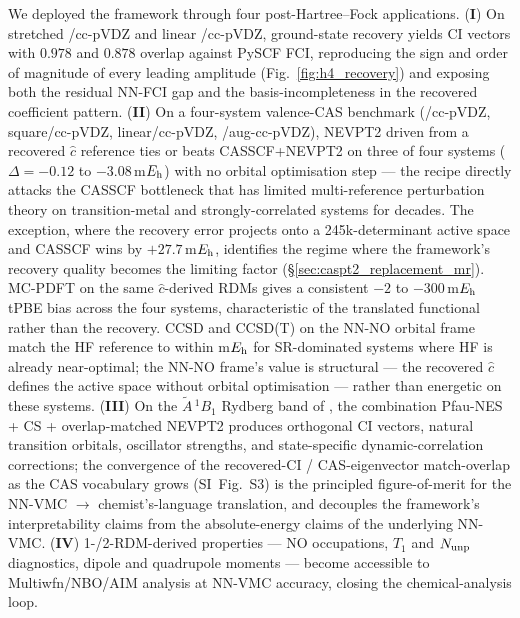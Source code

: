 \documentclass[journal=jctcce,manuscript=article,layout=traditional]{achemso}
\begin{document}
We deployed the framework through four post-Hartree--Fock applications.
(\textbf{I}) On stretched /cc-pVDZ and linear /cc-pVDZ,
ground-state recovery yields CI vectors with $0.978$ and $0.878$
overlap against PySCF FCI, reproducing the sign and order of magnitude
of every leading amplitude
(Fig.~\ref{fig:h4_recovery}) and exposing both the residual NN-FCI gap
and the basis-incompleteness in the recovered coefficient pattern.
(\textbf{II}) On a four-system valence-CAS benchmark
(/cc-pVDZ,  square/cc-pVDZ,  linear/cc-pVDZ,
/aug-cc-pVDZ), NEVPT2 driven from a recovered $\widehat c$
reference ties or beats CASSCF+NEVPT2 on three of four systems
($\Delta = -0.12$ to $-3.08$\,m$E_{\rm h}$) with no orbital
optimisation step --- the recipe directly attacks the CASSCF
bottleneck that has limited multi-reference perturbation theory on
transition-metal and strongly-correlated systems for decades. The
 exception, where the recovery error projects onto a
245k-determinant active space and CASSCF wins by $+27.7$\,m$E_{\rm
h}$, identifies the regime where the framework's recovery quality
becomes the limiting factor (\S\ref{sec:caspt2_replacement_mr}).
MC-PDFT on the same $\widehat c$-derived RDMs gives a consistent
$-2$ to $-300$\,m$E_{\rm h}$ tPBE bias across the four systems,
characteristic of the translated functional rather than the
recovery. CCSD and CCSD(T) on the NN-NO orbital frame match the HF
reference to within m$E_{\rm h}$ for SR-dominated systems where HF
is already near-optimal; the NN-NO frame's value is structural ---
the recovered $\widehat c$ defines the active space without orbital
optimisation --- rather than energetic on these systems.
(\textbf{III}) On the $\tilde A\,^1B_1$ Rydberg band of , the
combination Pfau-NES + CS + overlap-matched NEVPT2 produces orthogonal
CI vectors, natural transition orbitals, oscillator strengths, and
state-specific dynamic-correlation corrections; the convergence of
the recovered-CI / CAS-eigenvector match-overlap as the CAS vocabulary
grows (SI~Fig.~S3) is the principled
figure-of-merit for the NN-VMC $\to$ chemist's-language translation,
and decouples the framework's interpretability claims from the
absolute-energy claims of the underlying NN-VMC. (\textbf{IV})
1-/2-RDM-derived properties --- NO occupations, $T_1$ and $N_{\rm
unp}$ diagnostics, dipole and quadrupole moments --- become accessible
to Multiwfn/NBO/AIM analysis at NN-VMC accuracy, closing the
chemical-analysis loop.
\end{document}
